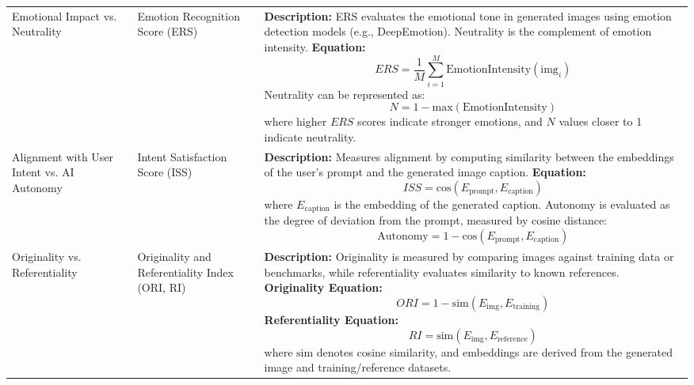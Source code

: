 \begin{longtable}{|p{3cm}|p{4cm}|p{6cm}|}
Emotional Impact vs. Neutrality & 
Emotion Recognition Score (ERS) & 
\textbf{Description:} ERS evaluates the emotional tone in generated images using emotion detection models (e.g., DeepEmotion). Neutrality is the complement of emotion intensity. \newline
\textbf{Equation:}
\[
ERS = \frac{1}{M} \sum_{i=1}^M \text{EmotionIntensity}(\text{img}_i)
\]
Neutrality can be represented as:
\[
N = 1 - \text{max}(\text{EmotionIntensity})
\]
where higher \(ERS\) scores indicate stronger emotions, and \(N\) values closer to 1 indicate neutrality. \\

Alignment with User Intent vs. AI Autonomy & 
Intent Satisfaction Score (ISS) & 
\textbf{Description:} Measures alignment by computing similarity between the embeddings of the user's prompt and the generated image caption. \newline
\textbf{Equation:}
\[
ISS = \text{cos}(E_{\text{prompt}}, E_{\text{caption}})
\]
where \(E_{\text{caption}}\) is the embedding of the generated caption. Autonomy is evaluated as the degree of deviation from the prompt, measured by cosine distance:
\[
\text{Autonomy} = 1 - \text{cos}(E_{\text{prompt}}, E_{\text{caption}})
\] \\

Originality vs. Referentiality & 
Originality and Referentiality Index (ORI, RI) & 
\textbf{Description:} Originality is measured by comparing images against training data or benchmarks, while referentiality evaluates similarity to known references. \newline
\textbf{Originality Equation:}
\[
ORI = 1 - \text{sim}(E_{\text{img}}, E_{\text{training}})
\]
\textbf{Referentiality Equation:}
\[
RI = \text{sim}(E_{\text{img}}, E_{\text{reference}})
\]
where \(\text{sim}\) denotes cosine similarity, and embeddings are derived from the generated image and training/reference datasets. \\

\end{longtable}


\twocolumn



\pagebreak